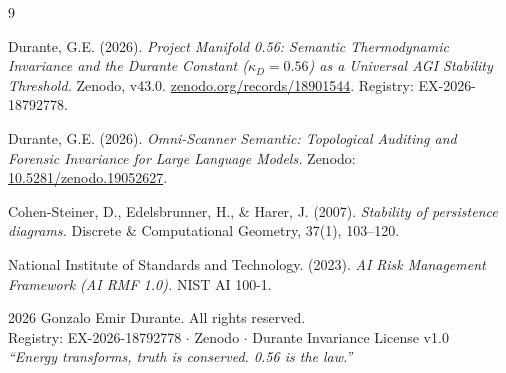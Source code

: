 \documentclass[11pt, a4paper]{article}
\begin{document}
\newpage
\begin{thebibliography}{9}

Durante, G.E. (2026).
\textit{Project Manifold 0.56: Semantic Thermodynamic Invariance and the
Durante Constant ($\kappa_D = 0.56$) as a Universal AGI Stability Threshold.}
Zenodo, v43.0.
\href{https://zenodo.org/records/18901544}{zenodo.org/records/18901544}.
Registry: EX-2026-18792778.

Durante, G.E. (2026).
\textit{Omni-Scanner Semantic: Topological Auditing and Forensic Invariance
for Large Language Models.}
Zenodo: \href{https://zenodo.org/records/19052627}{10.5281/zenodo.19052627}.

Cohen-Steiner, D., Edelsbrunner, H., \& Harer, J. (2007).
\textit{Stability of persistence diagrams.}
Discrete \& Computational Geometry, 37(1), 103--120.

National Institute of Standards and Technology. (2023).
\textit{AI Risk Management Framework (AI RMF 1.0).} NIST AI 100-1.

\end{thebibliography}

\vspace{1cm}
\begin{center}
\small\color{duranteamber}
\textcopyright{} 2026 Gonzalo Emir Durante. All rights reserved.\\
Registry: EX-2026-18792778 $\cdot$ Zenodo $\cdot$ Durante Invariance License v1.0\\[4pt]
\textit{``Energy transforms, truth is conserved. 0.56 is the law.''}
\end{center}
\end{document}
